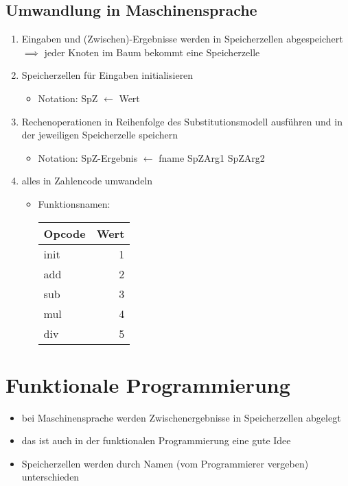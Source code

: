 \documentclass[a4paper]{scrartcl}
\theoremstyle{definition}
\theoremstyle{plain}
\theoremstyle{remark}
\theoremstyle{remark}
\begin{document}
\subsection{Umwandlung in Maschinensprache}
\label{sec-5-1}
\begin{enumerate}
\item Eingaben und (Zwischen)-Ergebnisse werden in Speicherzellen abgespeichert $\implies$ jeder Knoten im Baum bekommt eine Speicherzelle
\item Speicherzellen für Eingaben initialisieren
\begin{itemize}
\item Notation: SpZ $\leftarrow$ Wert
\end{itemize}
\item Rechenoperationen in Reihenfolge des Substitutionsmodell ausführen und in der jeweiligen Speicherzelle speichern
\begin{itemize}
\item Notation: SpZ-Ergebnis $\leftarrow$ fname SpZArg1 SpZArg2
\end{itemize}
\item alles in Zahlencode umwandeln
\begin{itemize}
\item Funktionsnamen:
\begin{center}
\begin{tabular}{lr}
Opcode & Wert\\
\hline
init & 1\\
add & 2\\
sub & 3\\
mul & 4\\
div & 5\\
\end{tabular}
\end{center}
\end{itemize}
\end{enumerate}
\section{Funktionale Programmierung}
\label{sec-6}
\begin{itemize}
\item bei Maschinensprache werden Zwischenergebnisse in Speicherzellen abgelegt
\item das ist auch in der funktionalen Programmierung eine gute Idee
\item Speicherzellen werden durch Namen (vom Programmierer vergeben) unterschieden
\end{itemize}
\end{document}
